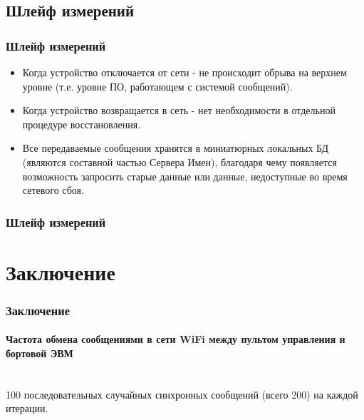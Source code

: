 \documentclass{beamer}
\begin{document}
\subsection{Шлейф измерений}
\begin{frame} 
\frametitle{Шлейф измерений}
\begin{itemize}
  \item Когда устройство отключается от сети - не происходит обрыва на верхнем
  уровне (т.е. уровне ПО, работающем с системой сообщений).
  \item Когда устройство возвращается в сеть - нет
  необходимости в отдельной процедуре восстановления.
  \item Все передаваемые сообщения хранятся в миниатюрных локальных БД
  (являются составной частью Сервера Имен), благодаря чему появляется
  возможность запросить старые данные или данные, недоступные во время сетевого сбоя.
\end{itemize}
\end{frame}

\begin{frame} 
\frametitle{Шлейф измерений}

\end{frame}


\section{Заключение}
\begin{frame}

\frametitle{Заключение}

\framesubtitle{Частота обмена сообщениями в сети WiFi между пультом управления и
бортовой ЭВМ}
 \\
100 последовательных случайных синхронных сообщений (всего 200) на каждой
итерации.
\end{frame}
\end{document}
